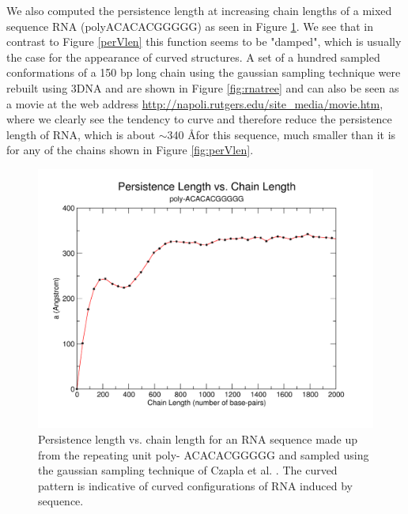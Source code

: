 We also computed the persistence length at increasing chain lengths
of a mixed sequence RNA (polyACACACGGGGG) as seen in Figure
\ref{fig:curved}. We see that in contrast to Figure \ref{perVlen} this
function seems to be "damped", which is usually the case for the
appearance of curved structures. A set of a hundred sampled conformations
of a 150 bp long chain using the gaussian sampling technique were
rebuilt using 3DNA and are shown in Figure \ref{fig:rnatree} and can
also be seen as a movie at the web address
\url{http://napoli.rutgers.edu/site_media/movie.htm}, where we
clearly see the tendency to curve and therefore reduce the persistence
length of RNA, which is about $\sim$340 \AA for this sequence, much
smaller than it is for any of the chains shown in Figure \ref{fig:perVlen}.

\begin{figure}
\centering
\includegraphics[angle=0, scale=0.6]{Chapter4/dampedlike.png}
\caption{Persistence length vs. chain length for an RNA sequence made up
  from the repeating unit poly- ACACACGGGGG and sampled using the gaussian
  sampling technique of Czapla et al. \cite{czapla2006}. The curved
  pattern is indicative of curved configurations of RNA induced by sequence.}
\label{fig:curved}
\end{figure}

